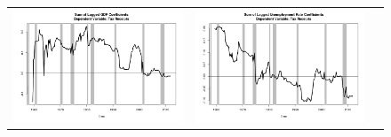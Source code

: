 \documentclass[12pt]{article}
\begin{document}
\begin{figure}
\begin{center}
\begin{tabular}{ccc}
\includegraphics[scale=0.34]{pics/coef_tax_gdp.png} & \includegraphics[scale=0.34]{pics/coef_tax_unemployment.png} \\

\end{tabular}
\end{center}
\end{figure}
\end{document}
